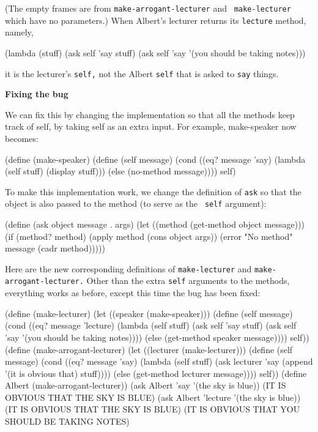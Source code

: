 \vskip 2in

(The empty frames are from {\tt make-arrogant-lecturer} and {\tt
make-lecturer} which have no parameters.)  When Albert's lecturer
returns its {\tt lecture} method, namely,

\beginlisp
(lambda (stuff)
  (ask self 'say stuff)
  (ask self 'say '(you should be taking notes)))
\endlisp

it is the lecturer's {\tt self,} not the Albert {\tt self} that is asked to
{\tt say} things. 

{\bf Fixing the bug}

We can fix this by changing the implementation so that all the methods
keep track of self, by taking self as an extra input.  For example,
make-speaker now becomes:  

\beginlisp
(define (make-speaker)
  (define (self message)
    (cond ((eq? message 'say)
           (lambda (self stuff) (display stuff)))
          (else (no-method message))))
  self)
\endlisp

To make this implementation work, we change the definition of  {\tt ask}
so that the object is also passed to the method (to serve as the {\tt
self} argument):  

\beginlisp
(define (ask object message . args)
  (let ((method (get-method object message)))
    (if (method? method)
         (apply method (cons object args))
         (error "No method" message (cadr method)))))
\endlisp

Here are the new corresponding definitions of {\tt make-lecturer} and
{\tt make-arrogant-lecturer.}  Other than the extra {\tt self} arguments
to the
methods, everything works as before, except this time the bug has been
fixed:   

\beginlisp
(define (make-lecturer)
  (let ((speaker (make-speaker)))
    (define (self message)
      (cond ((eq? message 'lecture)
             (lambda (self stuff)
               (ask self 'say stuff)
               (ask self 'say '(you should be taking notes))))
            (else (get-method speaker message))))
    self))
\null
(define (make-arrogant-lecturer)
  (let ((lecturer (make-lecturer)))
    (define (self message)
      (cond ((eq? message 'say)
             (lambda (self stuff)
               (ask lecturer 'say (append '(it is obvious that) stuff))))
            (else (get-method lecturer message))))
    self))
\null
(define Albert (make-arrogant-lecturer))
\null
(ask Albert 'say '(the sky is blue))
(IT IS OBVIOUS THAT THE SKY IS BLUE)
\null
(ask Albert 'lecture '(the sky is blue))
(IT IS OBVIOUS THAT THE SKY IS BLUE)
(IT IS OBVIOUS THAT YOU SHOULD BE TAKING NOTES)
\null
\endlisp

